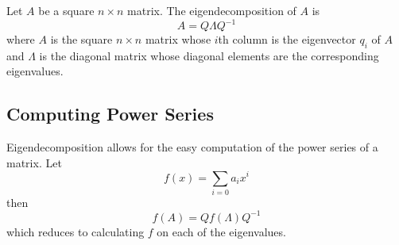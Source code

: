 \documentclass[../main.tex]{subfiles}
\begin{document}
\begin{definition}
Let $A$ be a square $n \times n$ matrix. The eigendecomposition of $A$ is
\begin{equation}
A = Q \Lambda Q^{-1}
\end{equation}
where $A$ is the square $n \times n$ matrix whose $i$th column is the eigenvector $q_i$ of $A$ and $\Lambda$ is the diagonal matrix whose diagonal elements are the corresponding eigenvalues.
\end{definition}

\subsection{Computing Power Series}
Eigendecomposition allows for the easy computation of the power series of a matrix. Let
\begin{equation*}
f(x) = \sum_{i=0}{a_ix^i}
\end{equation*}
then
\begin{equation*}
f(A) = Qf(\Lambda)Q^{-1}
\end{equation*}
which reduces to calculating $f$ on each of the eigenvalues.
\end{document}
